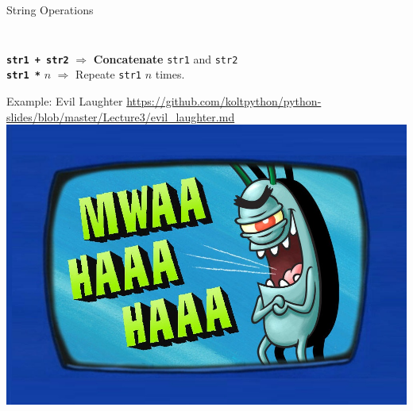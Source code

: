         \begin{frame}{String Operations}
            \large
            \pause
            \inputminted[frame=single,framesep=2pt, lastline=4]{python3}{code-examples/string_operations.py}
            \pause
            \inputminted[frame=single,framesep=2pt, firstline=6]{python3}{code-examples/string_operations.py}
            \pause
            \LARGE
            \texttt{\textbf{str1 + str2}} $\Rightarrow$ \textbf{Concatenate} \texttt{str1} and \texttt{str2}\\
            \pause
            \texttt{\textbf{str1 *}} $n$ $\Rightarrow$  Repeate \texttt{str1} $n$ times.
        \end{frame}

        \begin{frame}{Example: Evil Laughter}
             \url{https://github.com/koltpython/python-slides/blob/master/Lecture3/evil_laughter.md}
             \newline
             \newline
             \pause
             \centering
            \includegraphics[height=0.6\textheight]{images/evil_laugh.jpg}
           
        \end{frame}

